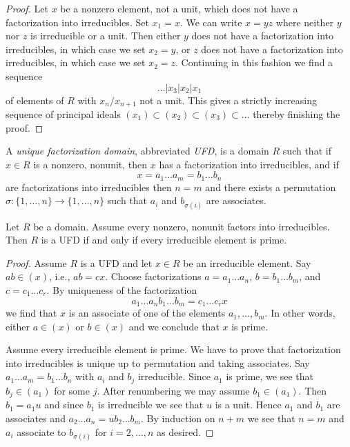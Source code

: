 \begin{proof}
Let $x$ be a nonzero element, not a unit, which does not have a
factorization into
irreducibles. Set $x_1 = x$. We can write $x = yz$ where neither
$y$ nor $z$ is irreducible or a unit.
Then either $y$ does not have a factorization
into irreducibles, in which case we set $x_2 = y$, or $z$ does not
have a factorization into irreducibles, in which case we set $x_2 = z$.
Continuing in this fashion we find a sequence
$$
\ldots | x_3 | x_2 | x_1
$$
of elements of $R$ with $x_n/x_{n + 1}$ not a unit.
This gives a strictly increasing sequence of principal ideals
$(x_1) \subset (x_2) \subset (x_3) \subset \ldots$ thereby finishing the proof.
\end{proof}

\begin{definition}
\label{definition-UFD}
A {\it unique factorization domain}, abbreviated {\it UFD},
is a domain $R$ such that
if $x \in R$ is a nonzero, nonunit, then $x$ has a factorization
into irreducibles, and if
$$
x = a_1 \ldots a_m = b_1 \ldots b_n
$$
are factorizations into irreducibles then $n = m$ and
there exists a permutation $\sigma : \{1, \ldots, n\} \to \{1, \ldots, n\}$
such that $a_i$ and $b_{\sigma(i)}$ are associates.
\end{definition}

\begin{lemma}
\label{lemma-characterize-UFD}
Let $R$ be a domain. Assume every nonzero, nonunit factors into
irreducibles. Then $R$ is a UFD if and only if every irreducible
element is prime.
\end{lemma}

\begin{proof}
Assume $R$ is a UFD and let $x \in R$ be an irreducible element.
Say $ab \in (x)$, i.e., $ab = cx$. Choose factorizations
$a = a_1 \ldots a_n$, $b = b_1 \ldots b_m$, and $c = c_1 \ldots c_r$.
By uniqueness of the factorization
$$
a_1 \ldots a_n b_1 \ldots b_m = c_1 \ldots c_r x
$$
we find that $x$ is an associate of one of the elements
$a_1, \ldots, b_m$. In other words, either $a \in (x)$ or $b \in (x)$
and we conclude that $x$ is prime.

\medskip\noindent
Assume every irreducible element is prime. We have to prove that
factorization into irreducibles is unique up to permutation and
taking associates. Say $a_1 \ldots a_m = b_1 \ldots b_n$ with $a_i$
and $b_j$ irreducible. Since $a_1$ is prime, we see that
$b_j \in (a_1)$ for some $j$. After renumbering we may assume
$b_1 \in (a_1)$. Then $b_1 = a_1 u$ and since $b_1$ is irreducible
we see that $u$ is a unit. Hence $a_1$ and $b_1$ are associates
and $a_2 \ldots a_n = ub_2\ldots b_m$. By induction on $n + m$
we see that $n = m$ and $a_i$ associate to $b_{\sigma(i)}$ for
$i = 2, \ldots, n$ as desired.
\end{proof}

